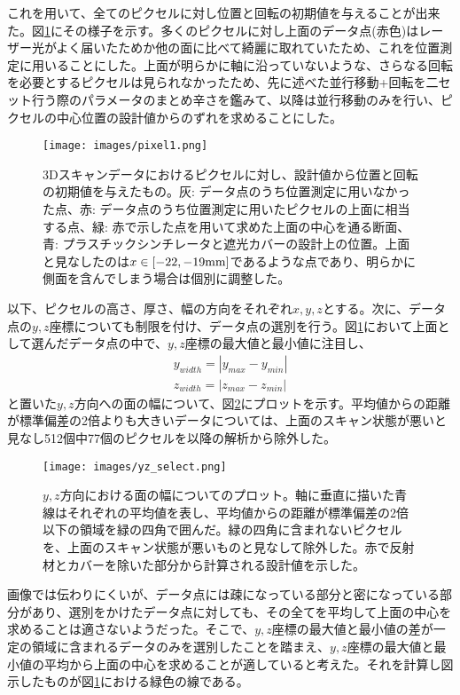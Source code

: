 \documentclass[Yonemoto_master.tex]{subfiles}
\begin{document}
これを用いて、全てのピクセルに対し位置と回転の初期値を与えることが出来た。図\ref{fig: scan_pixel}にその様子を示す。多くのピクセルに対し上面のデータ点(赤色)はレーザー光がよく届いたためか他の面に比べて綺麗に取れていたため、これを位置測定に用いることにした。上面が明らかに軸に沿っていないような、さらなる回転を必要とするピクセルは見られなかったため、先に述べた並行移動+回転を二セット行う際のパラメータのまとめ辛さを鑑みて、以降は並行移動のみを行い、ピクセルの中心位置の設計値からのずれを求めることにした。
\begin{figure}[h]
  \centering
  \texttt{[image: images/pixel1.png]}
  \caption{3Dスキャンデータにおけるピクセルに対し、設計値から位置と回転の初期値を与えたもの。灰: データ点のうち位置測定に用いなかった点、赤: データ点のうち位置測定に用いたピクセルの上面に相当する点、緑: 赤で示した点を用いて求めた上面の中心を通る断面、青: プラスチックシンチレータと遮光カバーの設計上の位置。上面と見なしたのは$x \in [-22, -19 {\rm mm}]$であるような点であり、明らかに側面を含んでしまう場合は個別に調整した。}
  \label{fig: scan_pixel}
\end{figure}

以下、ピクセルの高さ、厚さ、幅の方向をそれぞれ$x, y, z$とする。次に、データ点の$y, z$座標についても制限を付け、データ点の選別を行う。図\ref{fig: scan_pixel}において上面として選んだデータ点の中で、$y, z$座標の最大値と最小値に注目し、
\begin{align}
y_{width} = | y_{max} - y_{min} | \\
z_{width} = | z_{max} - z_{min} |
\end{align}
と置いた$y, z$方向への面の幅について、図\ref{fig: yz_select}にプロットを示す。平均値からの距離が標準偏差の2倍よりも大きいデータについては、上面のスキャン状態が悪いと見なし512個中77個のピクセルを以降の解析から除外した。

\begin{figure}[h]
  \centering
  \texttt{[image: images/yz\_select.png]}
  \caption{$y, z$方向における面の幅についてのプロット。軸に垂直に描いた青線はそれぞれの平均値を表し、平均値からの距離が標準偏差の2倍以下の領域を緑の四角で囲んだ。緑の四角に含まれないピクセルを、上面のスキャン状態が悪いものと見なして除外した。赤で反射材とカバーを除いた部分から計算される設計値を示した。}
  \label{fig: yz_select}
\end{figure}

画像では伝わりにくいが、データ点には疎になっている部分と密になっている部分があり、選別をかけたデータ点に対しても、その全てを平均して上面の中心を求めることは適さないようだった。そこで、$y, z$座標の最大値と最小値の差が一定の領域に含まれるデータのみを選別したことを踏まえ、$y, z$座標の最大値と最小値の平均から上面の中心を求めることが適していると考えた。それを計算し図示したものが図\ref{fig: scan_pixel}における緑色の線である。
\end{document}
